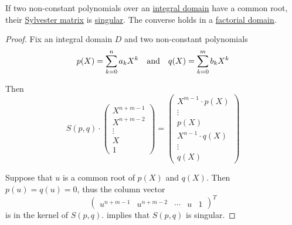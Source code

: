 \begin{proposition}\label{thm:common_root_implies_sylvester_matrix_singular}
  If two non-constant polynomials over an \hyperref[def:integral_domain]{integral domain} have a common root, their \hyperref[def:sylvester_matrix]{Sylvester matrix} is \hyperref[def:inverse_matrix]{singular}. The converse holds in a \hyperref[def:factorial_domain]{factorial domain}.
\end{proposition}
\begin{proof}
  Fix an integral domain \( D \) and two non-constant polynomials
  \begin{align*}
    p(X) = \sum_{k=0}^n a_k X^k
    &&\T{and}&&
    q(X) = \sum_{k=0}^m b_k X^k
  \end{align*}

  Then
  \begin{equation}\label{eq:thm:common_root_iff_sylvester_matrix_singular/proof}
    S(p, q)
    \cdot
    \begin{pmatrix}
      X^{n+m-1} \\
      X^{n+m-2} \\
      \vdots    \\
      X         \\
      1
    \end{pmatrix}
    =
    \begin{pmatrix}
      X^{m-1} \cdot p(X) \\
      \vdots             \\
      p(X)               \\
      X^{n-1} \cdot q(X) \\
      \vdots             \\
      q(X)
    \end{pmatrix}
  \end{equation}

  Suppose that \( u \) is a common root of \( p(X) \) and \( q(X) \). Then \( p(u) = q(u) = 0 \), thus the column vector
  \begin{equation*}
    \begin{pmatrix}
      u^{n+m-1} &
      u^{n+m-2} &
      \cdots    &
      u         &
      1
    \end{pmatrix}^T
  \end{equation*}
  is in the kernel of \( S(p, q) \).  implies that \( S(p, q) \) is singular.
\end{proof}

